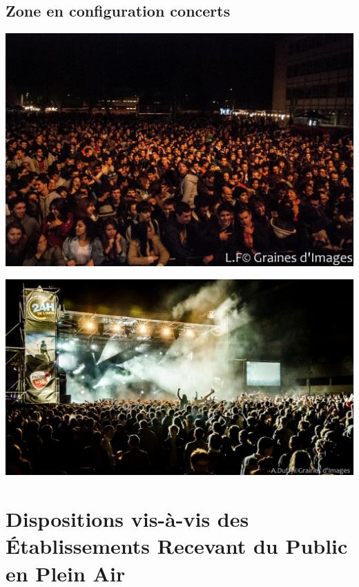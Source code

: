 \documentclass[hidelinks, paper=a4, fontsize=13pt]{report}
\begin{document}
\subsection{Zone en configuration concerts}

\begin{center}
	\includegraphics[scale=0.8]{images/concert2}
\end{center}
\vspace{10mm}
\begin{center}
	\includegraphics[scale=10]{images/concert1}
\end{center}
\newpage

\section{Dispositions vis-à-vis des Établissements Recevant du Public en Plein Air}
\end{document}

